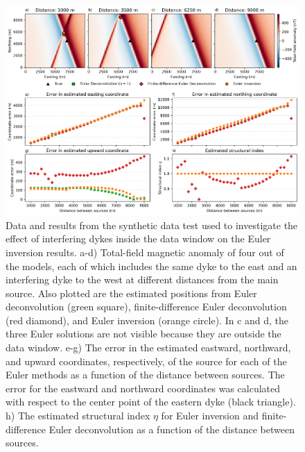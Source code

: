\begin{figure}[tb!]
\centering
\includegraphics[width=1\linewidth]{figures/synthetic-interfering-sources-dykes.png}
\caption{
    Data and results from the synthetic data test used to investigate the
    effect of interfering dykes inside the data window on the Euler inversion
    results.
    a-d) Total-field magnetic anomaly of four out of the \SynInterfDykesNModels{}
    models, each of which includes the same dyke to the east and an interfering
    dyke to the west at different distances from the main source. Also plotted
    are the estimated positions from Euler deconvolution (green square),
    finite-difference Euler deconvolution (red diamond), and Euler inversion
    (orange circle).
    In c and d, the three Euler solutions are not visible because they are
    outside the data window.
    e-g) The error in the estimated eastward, northward, and upward
    coordinates, respectively, of the source for each of the Euler methods as
    a function of the distance between sources. The error for the eastward and
    northward coordinates was calculated with respect to the center point of
    the eastern dyke (black triangle).
    h) The estimated structural index $\eta$ for Euler inversion and
    finite-difference Euler deconvolution as a function of the distance between
    sources.
}
\label{fig:interf-dykes}
\end{figure}

